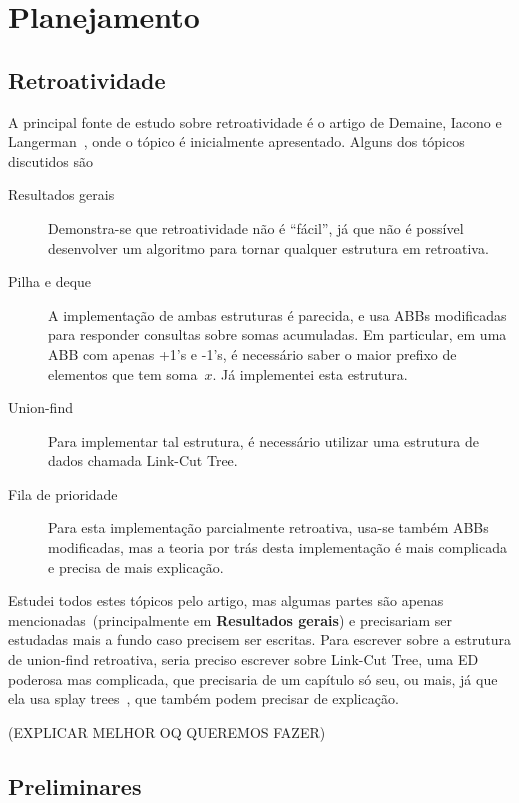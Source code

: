 \documentclass[quali.tex]{subfile}
\begin{document}
\section{Planejamento} \label{sec:planejamento}

\subsection{Retroatividade}

A principal fonte de estudo sobre retroatividade é o artigo de Demaine, Iacono e Langerman~\cite{DemaineIL2007}, onde o tópico é inicialmente apresentado. Alguns dos tópicos discutidos são

\begin{description}
	\item[Resultados gerais] Demonstra-se que retroatividade não é ``fácil'', já que não é possível desenvolver um algoritmo para tornar qualquer estrutura em retroativa.
	\item[Pilha e deque] A implementação de ambas estruturas é parecida, e usa ABBs modificadas para responder consultas sobre somas acumuladas. Em particular, em uma ABB com apenas +1's e -1's, é necessário saber o maior prefixo de elementos que tem soma~$x$. Já implementei esta estrutura.
	\item[Union-find] Para implementar tal estrutura, é necessário utilizar uma estrutura de dados chamada Link-Cut Tree.
	\item[Fila de prioridade] Para esta implementação parcialmente retroativa, usa-se também ABBs modificadas, mas a teoria por trás desta implementação é mais complicada e precisa de mais explicação.
\end{description}

Estudei todos estes tópicos pelo artigo, mas algumas partes são apenas mencionadas~(principalmente em \textbf{Resultados gerais}) e precisariam ser estudadas mais a fundo caso precisem ser escritas. Para escrever sobre a estrutura de union-find retroativa, seria preciso escrever sobre Link-Cut Tree, uma ED poderosa mas complicada, que precisaria de um capítulo só seu, ou mais, já que ela usa splay trees~\cite{SleatorT1985}, que também podem precisar de explicação.

(EXPLICAR MELHOR OQ QUEREMOS FAZER) %

\subsection{Preliminares}
\end{document}
